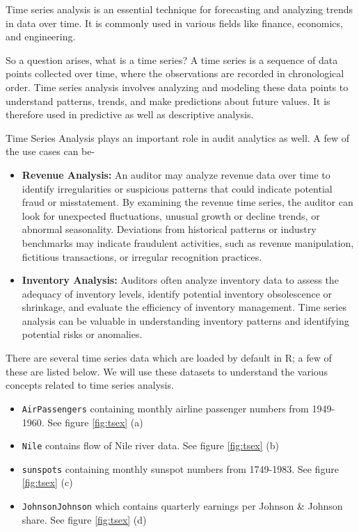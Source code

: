 \documentclass[
]{book}
\providecommand{\tightlist}{%
  \setlength{\itemsep}{0pt}\setlength{\parskip}{0pt}}
\begin{document}
Time series analysis is an essential technique for forecasting and analyzing trends in data over time. It is commonly used in various fields like finance, economics, and engineering.

So a question arises, what is a time series? A time series is a sequence of data points collected over time, where the observations are recorded in chronological order. Time series analysis involves analyzing and modeling these data points to understand patterns, trends, and make predictions about future values. It is therefore used in predictive as well as descriptive analysis.

Time Series Analysis plays an important role in audit analytics as well. A few of the use cases can be-

\begin{itemize}
\tightlist
\item
  \textbf{Revenue Analysis:} An auditor may analyze revenue data over time to identify irregularities or suspicious patterns that could indicate potential fraud or misstatement. By examining the revenue time series, the auditor can look for unexpected fluctuations, unusual growth or decline trends, or abnormal seasonality. Deviations from historical patterns or industry benchmarks may indicate fraudulent activities, such as revenue manipulation, fictitious transactions, or irregular recognition practices.
\item
  \textbf{Inventory Analysis:} Auditors often analyze inventory data to assess the adequacy of inventory levels, identify potential inventory obsolescence or shrinkage, and evaluate the efficiency of inventory management. Time series analysis can be valuable in understanding inventory patterns and identifying potential risks or anomalies.
\end{itemize}

There are several time series data which are loaded by default in R; a few of these are listed below. We will use these datasets to understand the various concepts related to time series analysis.

\begin{itemize}
\tightlist
\item
  \texttt{AirPassengers} containing monthly airline passenger numbers from 1949-1960. See figure \ref{fig:tsex} (a)
\item
  \texttt{Nile} contains flow of Nile river data. See figure \ref{fig:tsex} (b)
\item
  \texttt{sunspots} containing monthly sunspot numbers from 1749-1983. See figure \ref{fig:tsex} (c)
\item
  \texttt{JohnsonJohnson} which contains quarterly earnings per Johnson \& Johnson share. See figure \ref{fig:tsex} (d)
\end{itemize}
\end{document}
